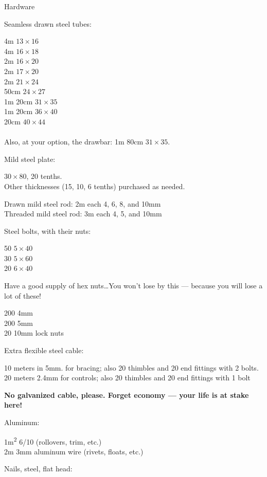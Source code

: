 \documentclass{book}
\begin{document}
{{\item{Hardware}

  Seamless drawn steel tubes:

  4m $13\times16$\\
  4m $16\times18$\\
  2m $16\times20$\\
  2m $17\times20$\\
  2m $21\times24$\\
  50cm $24\times27$\\
  1m 20cm $31\times35$\\
  1m 20cm $36\times40$\\
  20cm $40\times44$\\
  \\
  Also, at your option, the drawbar: 1m 80cm $31\times35$.

  Mild steel plate:

  $30\times80$, 20 tenths.\\
  Other thicknesses (15, 10, 6 tenths) purchased as needed.

  Drawn mild steel rod: 2m each 4, 6, 8, and 10mm\\
  Threaded mild steel rod: 3m each 4, 5, and 10mm

  Steel bolts, with their nuts:

  50 $5\times40$\\
  30 $5\times 60$\\
  20 $6\times40$

  Have a good supply of hex nuts\ldots You won't lose by this ---
  because you will lose a lot of these!

  200 4mm\\
  200 5mm\\
  20 10mm lock nuts

  Extra flexible steel cable:

  10 meters in 5mm. for bracing; also 20 thimbles and 20 end fittings
  with 2 bolts.\\
  20 meters 2.4mm for controls; also 20 thimbles and 20 end fittings
  with 1 bolt

  \textbf{No galvanized cable, please.  Forget economy --- your life
    is at stake here!}

  Aluminum:

  1m\textsuperscript{2} 6/10 (rollovers, trim, etc.)\\
  2m 3mm aluminum wire (rivets, floats, etc.)

  Nails, steel, flat head:

}}
\end{document}
